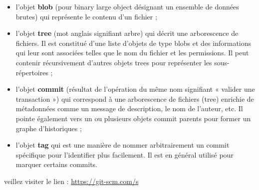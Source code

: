 \begin{itemize}[label=$\ast$]
	
	\item  l'objet \textbf{blob} (pour binary large object désignant un ensemble de données brutes) qui
	représente le contenu d'un fichier ;
	\item l'objet \textbf{tree} (mot anglais signifiant arbre) qui décrit une arborescence de fichiers. Il est
	constitué d'une liste d'objets de type blobs et des informations qui leur sont associées
	telles que le nom du fichier et les permissions. Il peut contenir récursivement d'autres
	objets trees pour représenter les sous-répertoires ;
	\item l'objet \textbf{commit} (résultat de l'opération du même nom signifiant « valider une transaction
	») qui correspond à une arborescence de fichiers (tree) enrichie de métadonnées comme
	un message de description, le nom de l'auteur, etc. Il pointe également vers un ou
	plusieurs objets commit parents pour former un graphe d'historiques ;
	\item l'objet \textbf{tag} qui est une manière de nommer arbitrairement un commit
	spécifique pour l'identifier plus facilement. Il est en général utilisé pour marquer certains
	commits.
	
\end{itemize}


veillez
visiter le lien :
\href{https://git-scm.com/s}{https://git-scm.com/s}

